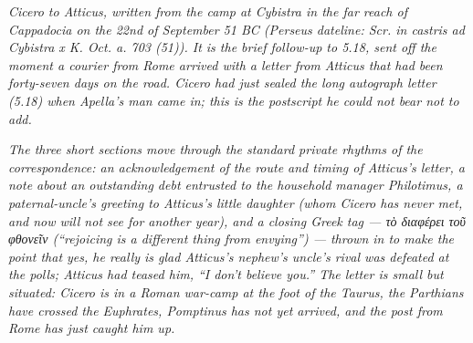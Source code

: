 
\textit{Cicero to Atticus, written from the camp at
Cybistra in the far reach of Cappadocia on the 22nd of
September 51 BC (Perseus dateline: \textit{Scr. in
castris ad Cybistra x K. Oct. a. 703 (51)}). It is the
brief follow-up to 5.18, sent off the moment a courier
from Rome arrived with a letter from Atticus that had
been forty-seven days on the road. Cicero had just
sealed the long autograph letter (5.18) when Apella's
man came in; this is the postscript he could not bear
not to add.}

\textit{The three short sections move through the
standard private rhythms of the correspondence: an
acknowledgement of the route and timing of Atticus's
letter, a note about an outstanding debt entrusted to
the household manager Philotimus, a paternal-uncle's
greeting to Atticus's little daughter (whom Cicero has
never met, and now will not see for another year), and
a closing Greek tag --- \textgreek{τὸ διαφέρει τοῦ
φθονεῖν} (``rejoicing is a different thing from
envying'') --- thrown in to make the point that yes, he
really is glad Atticus's nephew's uncle's rival was
defeated at the polls; Atticus had teased him, ``I
don't believe you.'' The letter is small but situated:
Cicero is in a Roman war-camp at the foot of the Taurus,
the Parthians have crossed the Euphrates, Pomptinus has
not yet arrived, and the post from Rome has just caught
him up.}
